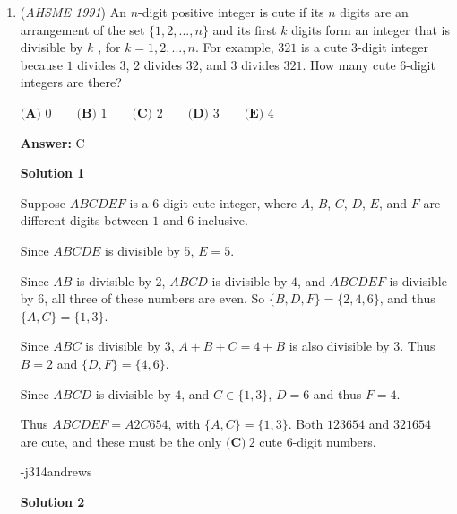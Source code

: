 \begin{enumerate}
 \textbf{Answer: }D



\textbf{Solution}

$\fbox{D}$ It is well known that $T_n = \frac{n(n+1)}{2}$, so we can put this in and simplify to get that the general term of the product is $\frac{n(n+1)}{(n+2)(n-1)}.$ Now by writing out the terms, we see that almost everything cancels (telescopes), giving $\frac{3 \times 1991}{1993}$ which is almost $3$, so closest to $2.9.$



	\item (\textit{AHSME 1991}) An $n$-digit positive integer is cute if its $n$ digits are an arrangement of the set $\{1,2,...,n\}$ and its first 
$k$ digits form an integer that is divisible by $k$  , for  $k  = 1,2,...,n$. For example, $321$ is a cute $3$-digit integer because $1$ divides $3$, $2$ divides $32$, and $3$ divides $321$. How many cute $6$-digit integers are there?


 $\textbf{(A) } 0\qquad \textbf{(B) } 1\qquad \textbf{(C) } 2\qquad \textbf{(D) } 3\qquad \textbf{(E) } 4$

 \textbf{Answer: }C



\textbf{Solution 1}

Suppose $ABCDEF$ is a $6$-digit cute integer, where $A$, $B$, $C$, $D$, $E$, and $F$ are different digits between $1$ and $6$ inclusive.

 Since $ABCDE$ is divisible by $5$, $E = 5$.

 Since $AB$ is divisible by $2$, $ABCD$ is divisible by $4$, and $ABCDEF$ is divisible by $6$, all three of these numbers are even.  So $\{B, D, F\} = \{2, 4, 6\}$, and thus $\{A, C\} = \{1, 3\}$.

 Since $ABC$ is divisible by $3$, $A + B + C = 4 + B$ is also divisible by $3$.  Thus $B = 2$ and $\{D, F\} = \{4, 6\}$.

 Since $ABCD$ is divisible by $4$, and $C \in \{1, 3\}$, $D = 6$ and thus $F = 4$.

 Thus $ABCDEF = A2C654$, with $\{A, C\} = \{1, 3\}$.  Both $123654$ and $321654$ are cute, and these must be the only $\boxed{\textbf{(C)}\ 2}$ cute $6$-digit numbers. 

 -j314andrews 

 



\textbf{Solution 2}


\end{enumerate}
